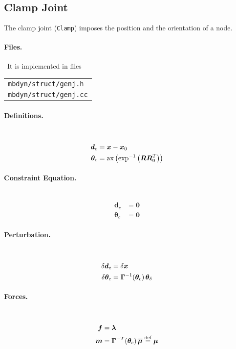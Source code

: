 \documentclass[10pt,fleqn,subeqn]{report}
\newcommand{\T}[1]{\bm{#1}}
\newcommand{\TT}[1]{\bm{#1}}
\begin{document}
\subsection{Clamp Joint}
\label{sec:ClampJoint}
The clamp joint (\texttt{Clamp}) imposes the position
and the orientation of a node.

\paragraph{Files.} \
It is implemented in files

\begin{tabular}{l}
\texttt{mbdyn/struct/genj.h} \\
\texttt{mbdyn/struct/genj.cc}
\end{tabular}

\paragraph{Definitions.} \
\begin{align}
	\T{d}_c &= \T{x} - \T{x}_0 \\
	\T{\theta}_c &= \mathrm{ax}\plbr{\mathrm{exp}^{-1}\plbr{\TT{R}\TT{R}_0^T}}
\end{align}

\paragraph{Constraint Equation.} \
\begin{align}
	\T{d}_c &= \T{0} \\
	\T{\theta}_c &= \T{0}
\end{align}

\paragraph{Perturbation.} \
\begin{align}
	\delta\T{d}_c &= \delta\T{x} \\
	\delta\T{\theta}_c &= \TT{\Gamma}^{-1}\!\plbr{\T{\theta}_c} \T{\theta}_{\delta}
\end{align}

\paragraph{Forces.} \
\begin{subequations}
\begin{align}
	\T{f} &= \T{\lambda} \\
	\T{m} &= \TT{\Gamma}^{-T}\!\plbr{\T{\theta}_c} \overline{\T{\mu}}
	\overset{\text{def}}{=} \T{\mu}
\end{align}
\end{subequations}
\end{document}
